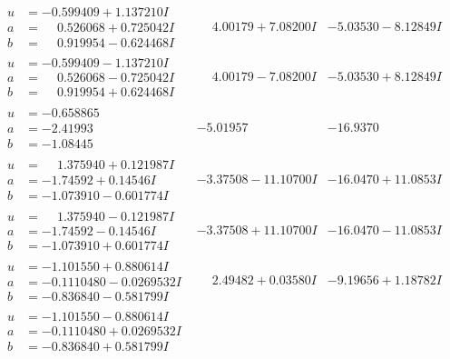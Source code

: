 \documentclass[1p]{elsarticle_modified}
\theoremstyle{definition}
\begin{document}
$$\begin{array}{c|c|c}
\begin{aligned}
u &= -0.599409 + 1.137210 I \\
a &= \phantom{-}0.526068 + 0.725042 I \\
b &= \phantom{-}0.919954 - 0.624468 I\end{aligned}
 & \phantom{-}4.00179 + 7.08200 I & -5.03530 - 8.12849 I \\ \hline\begin{aligned}
u &= -0.599409 - 1.137210 I \\
a &= \phantom{-}0.526068 - 0.725042 I \\
b &= \phantom{-}0.919954 + 0.624468 I\end{aligned}
 & \phantom{-}4.00179 - 7.08200 I & -5.03530 + 8.12849 I \\ \hline\begin{aligned}
u &= -0.658865\phantom{ +0.000000I} \\
a &= -2.41993\phantom{ +0.000000I} \\
b &= -1.08445\phantom{ +0.000000I}\end{aligned}
 & -5.01957\phantom{ +0.000000I} & -16.9370\phantom{ +0.000000I} \\ \hline\begin{aligned}
u &= \phantom{-}1.375940 + 0.121987 I \\
a &= -1.74592 + 0.14546 I \\
b &= -1.073910 - 0.601774 I\end{aligned}
 & -3.37508 - 11.10700 I & -16.0470 + 11.0853 I \\ \hline\begin{aligned}
u &= \phantom{-}1.375940 - 0.121987 I \\
a &= -1.74592 - 0.14546 I \\
b &= -1.073910 + 0.601774 I\end{aligned}
 & -3.37508 + 11.10700 I & -16.0470 - 11.0853 I \\ \hline\begin{aligned}
u &= -1.101550 + 0.880614 I \\
a &= -0.1110480 - 0.0269532 I \\
b &= -0.836840 - 0.581799 I\end{aligned}
 & \phantom{-}2.49482 + 0.03580 I & -9.19656 + 1.18782 I \\ \hline\begin{aligned}
u &= -1.101550 - 0.880614 I \\
a &= -0.1110480 + 0.0269532 I \\
b &= -0.836840 + 0.581799 I\end{aligned}

\end{array}$$
\end{document}
